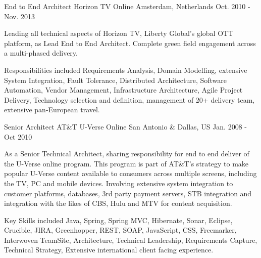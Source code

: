 


\begin{cventries}


\cventry
{End to End Architect} %
{Horizon TV Online} %
{Amsterdam, Netherlands} %
{Oct. 2010 - Nov. 2013} %
{ %
\begin{cvitems}
\item {Leading all technical aspects of Horizon TV, Liberty Global's global OTT platform, as Lead End to End Architect. Complete green field engagement across a multi-phased delivery.}
\item {Responsibilities included Requirements Analysis, Domain Modelling, extensive System Integration, Fault Tolerance, Distributed Architecture, Software Automation, Vendor Management, Infrastructure Architecture, Agile Project Delivery, Technology selection and definition, management of 20+ delivery team, extensive pan-European travel.}
\end{cvitems}
}


\cventry
{Senior Architect} %
{AT\&T U-Verse Online} %
{San Antonio \& Dallas, US} %
{Jan. 2008 - Oct 2010} %
{ %
\begin{cvitems}
\item {As a Senior Technical Architect, sharing responsibility for end to end deliver of the U-Verse online program. This program is part of AT\&T’s strategy to make popular U-Verse content available to consumers across multiple screens, including the TV, PC and mobile devices. Involving extensive system integration to customer platforms, databases, 3rd party payment servers, STB integration and integration with the likes of CBS, Hulu and MTV for content acquisition.}
\item {Key Skills included Java, Spring, Spring MVC, Hibernate, Sonar, Eclipse, Crucible, JIRA, Greenhopper, REST, SOAP, JavaScript, CSS, Freemarker, Interwoven TeamSite, Architecture, Technical Leadership, Requirements Capture, Technical Strategy, Extensive international client facing experience.}
\end{cvitems}
}


\end{cventries}
